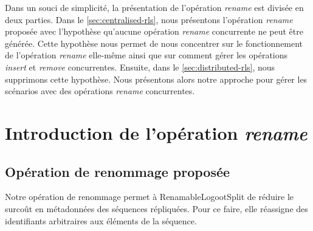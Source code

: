 \documentclass[12pt]{thesul}
\begin{document}
Dans un souci de simplicité, la présentation de l'opération \emph{rename} est divisée en deux parties.
Dans le \autoref{sec:centralised-rls}, nous présentons l'opération \emph{rename} proposée avec l'hypothèse qu'aucune opération \emph{rename} concurrente ne peut être générée.
Cette hypothèse nous permet de nous concentrer sur le fonctionnement de l'opération \emph{rename} elle-même ainsi que sur comment gérer les opérations \emph{insert} et \emph{remove} concurrentes.
Ensuite, dans le \autoref{sec:distributed-rls}, nous supprimons cette hypothèse.
Nous présentons alors notre approche pour gérer les scénarios avec des opérations \emph{rename} concurrentes.

\section{Introduction de l'opération \emph{rename}}
\label{sec:centralised-rls}
\subsection{Opération de renommage proposée}

Notre opération de renommage permet à RenamableLogootSplit de réduire le surcoût en métadonnées des séquences répliquées.
Pour ce faire, elle réassigne des identifiants arbitraires aux éléments de la séquence.
\end{document}
